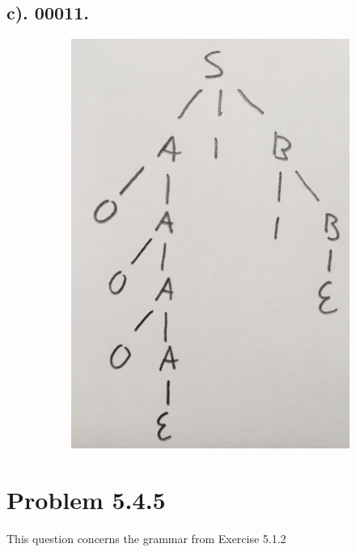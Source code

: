 \documentclass[20pt]{article} %
\begin{document}
\subsection{c). 00011.}
\begin{figure}[!htbp]
  	\centering
   	\begin{subfigure}[p]{0.4\linewidth}
    	\includegraphics[width=\linewidth]{./figures/h6-3.jpg}
   	\end{subfigure}
\end{figure} 

\section{Problem 5.4.5}
This question concerns the grammar from Exercise 5.1.2
\end{document}
